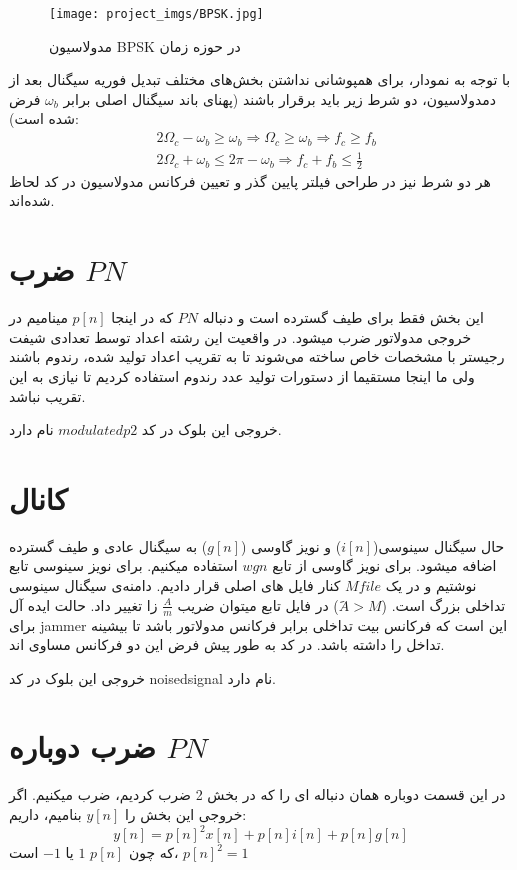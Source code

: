 \documentclass[11pt]{article}
\begin{document}
\begin{persian}
\begin{figure}[H]
\centerline{\texttt{[image: project\_imgs/BPSK.jpg]}}
\caption{مدولاسیون BPSK در حوزه زمان}
\end{figure}


با توجه به نمودار، برای همپوشانی نداشتن بخش‌های مختلف تبدیل فوریه سیگنال بعد از دمدولاسیون، دو شرط زیر باید برقرار باشند (پهنای باند سیگنال اصلی برابر $\omega_b$ فرض شده است):
\begin{equation}
\begin{split}
&2\Omega_c-\omega_b\geq \omega_b\Rightarrow \Omega_c\geq \omega_b \Rightarrow f_c\geq f_b\\
&2\Omega_c+\omega_b\leq 2\pi-\omega_b\Rightarrow f_c+f_b\leq \frac{1}{2}
\end{split}
\end{equation}
هر دو شرط نیز در طراحی فیلتر پایین گذر و تعیین فرکانس مدولاسیون در کد لحاظ شده‌اند.
\section{ضرب $PN$}
این بخش فقط برای طیف گسترده است و دنباله $PN$ که در اینجا $p[n]$ مینامیم در خروجی مدولاتور ضرب میشود. در واقعیت این رشته اعداد توسط تعدادی شیفت رجیستر با مشخصات خاص ساخته می‌شوند تا به تقریب اعداد تولید شده، رندوم باشند ولی ما اینجا مستقیما از دستورات تولید عدد رندوم استفاده کردیم تا نیازی به این تقریب نباشد.


خروجی این بلوک در کد $modulatedp2$ نام دارد.
\section{کانال}
حال سیگنال سینوسی($i[n]$) و نویز گاوسی ($g[n]$) به سیگنال عادی و طیف گسترده اضافه میشود. برای نویز گاوسی از تابع $wgn$ استفاده میکنیم. برای نویز سینوسی تابع نوشتیم و در یک $M file$ کنار فایل های اصلی قرار دادیم. دامنه‌ی سیگنال سینوسی تداخلی بزرگ است. ($َA>M$) در فایل تابع میتوان ضریب $\frac{A}{m}$  زا تغییر داد. حالت ایده آل برای jammer  این است که فرکانس بیت تداخلی برابر فرکانس مدولاتور باشد تا بیشینه تداخل را داشته باشد. در کد به طور پیش فرض این دو فرکانس مساوی اند.

خروجی این بلوک در کد noisedsignal نام دارد.
\section{ضرب دوباره $PN$}
در این قسمت دوباره همان دنباله ای را که در بخش 2 ضرب کردیم، ضرب میکنیم. اگر خروجی این بخش را $y[n]$ بنامیم، داریم:
$$
y[n] = p[n]^2x[n] + p[n] i[n] + p[n] g[n]
$$
که چون $p[n]$ 
$1$ یا $-1$ است، 
$p[n] ^2 = 1$


\end{persian}
\end{document}
